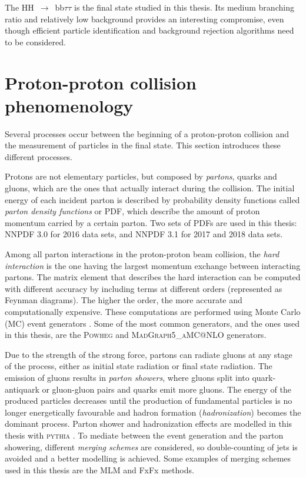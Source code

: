 \documentclass[../main.tex]{subfiles}
\begin{document}
The HH~$\to$~bb$\tau\tau$ is the final state studied in this thesis. Its medium branching ratio and relatively low background provides an interesting compromise, even though efficient particle identification and background rejection algorithms need to be considered.


\section{Proton-proton collision phenomenology}
\label{theo:sec:pp}

Several processes occur between the beginning of a proton-proton collision and the measurement of particles in the final state. This section introduces these different processes.

Protons are not elementary particles, but composed by \textit{partons}, quarks and gluons, which are the ones that actually interact during the collision. The initial energy of each incident parton is described by probability density functions called \textit{parton density functions} or PDF, which describe the amount of proton momentum carried by a certain parton. Two sets of PDFs are used in this thesis: NNPDF 3.0 \cite{intro:theo:pdf16} for 2016 data sets, and NNPDF 3.1 \cite{intro:theo:pdf1718} for 2017 and 2018 data sets.

Among all parton interactions in the proton-proton beam collision, the \textit{hard interaction} is the one having the largest momentum exchange between interacting partons. The matrix element that describes the hard interaction can be computed with different accuracy by including terms at different orders (represented as Feynman diagrams). The higher the order, the more accurate and computationally expensive. These computations are performed using Monte Carlo (MC) event generators \cite{intro:theo:mc}. Some of the most common generators, and the ones used in this thesis, are the \textsc{Powheg} \cite{hh:analysis:powheg} and \textsc{MadGraph5\_aMC@NLO} \cite{hh:analysis:madgraph} generators.

Due to the strength of the strong force, partons can radiate gluons at any stage of the process, either as initial state radiation or final state radiation. The emission of gluons results in \textit{parton showers}, where gluons split into quark-antiquark or gluon-gluon pairs and quarks emit more gluons. The energy of the produced particles decreases until the production of fundamental particles is no longer energetically favourable and hadron formation (\textit{hadronization}) becomes the dominant process. Parton shower and hadronization effects are modelled in this thesis with \textsc{pythia} \cite{intro:theo:pythia}. To mediate between the event generation and the parton showering, different \textit{merging schemes} are considered, so double-counting of jets is avoided and a better modelling is achieved. Some examples of merging schemes used in this thesis are the MLM \cite{intro:theo:mlm} and FxFx \cite{intro:theo:fxfx} methods.
\end{document}
